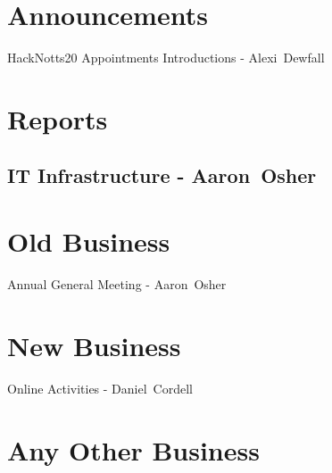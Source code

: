\documentclass[11pt,hacksoc,agenda]{meetingmins}
\begin{document}
\maketitle

\section{Announcements}
\begin{items}
\item{HackNotts20 Appointments Introductions - Alexi~Dewfall}
\end{items}

\section{Reports}
\subsection{IT Infrastructure - Aaron~Osher}
\begin{hiddensubitems}
\item {}
\end{hiddensubitems}

\section{Old Business}
\begin{items}
\item {Annual General Meeting - Aaron~Osher} 
\end{items}

\section{New Business}
\begin{items}
\item {Online Activities - Daniel~Cordell}
\end{items}

\section{Any Other Business}

\vspace{1em}
\nextmeeting{}
\end{document}
